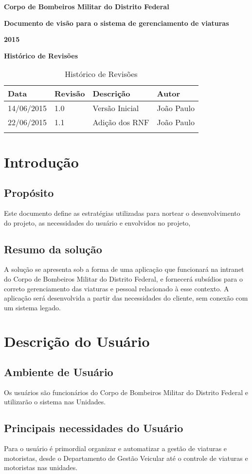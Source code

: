 	{\centering
	\textbf{Corpo de Bombeiros Militar do Distrito Federal}

	\textbf{Documento de visão para o sistema de gerenciamento de viaturas}

	\textbf{2015}

	}
	\textbf{Histórico de Revisões}
	\begin{table}[h]
	\centering
	\label{my-label}
	\begin{tabular}{|l|l|l|l|}
	\hline
	Data & Revisão & Descrição & Autor \\ \hline
	14/06/2015 & 1.0 & Versão Inicial & João Paulo \\ \hline
	22/06/2015 & 1.1 & Adição dos RNF & João Paulo \\ \hline
	     &         &           &       \\ \hline
	\end{tabular}
	\caption{Histórico de Revisões}
	\end{table}
  
	\section{Introdução}
		\subsection{Propósito}
Este documento define as estratégias utilizadas para nortear o desenvolvimento do projeto, as necessidades do usuário e envolvidos no projeto,
		\subsection{Resumo da solução}
A solução se apresenta sob a forma de uma aplicação que funcionará na intranet do Corpo de Bombeiros Militar do Distrito Federal, e fornecerá subsídios para o correto gerenciamento das viaturas e pessoal relacionado à esse contexto. A aplicação será desenvolvida a partir das necessidades do cliente, sem conexão com um sistema legado.
	\section{Descrição do Usuário}
		\subsection{Ambiente de Usuário}
Os usuários são funcionários do Corpo de Bombeiros Militar do Distrito Federal e utilizarão o sistema nas Unidades.
		\subsection{Principais necessidades do Usuário}
Para o usuário é primordial organizar e automatizar a gestão de viaturas e motoristas, desde o Departamento de Gestão Veicular até o controle de viaturas e motoristas nas unidades.
